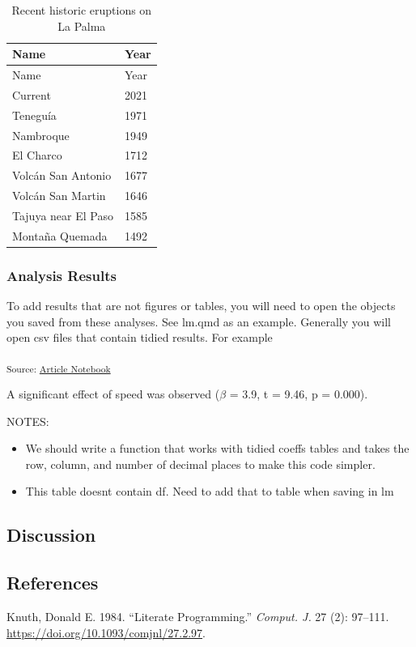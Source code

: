 \documentclass[
  letterpaper,
  DIV=11,
  numbers=noendperiod]{scrartcl}
\providecommand{\tightlist}{%
  \setlength{\itemsep}{0pt}\setlength{\parskip}{0pt}}\usepackage{longtable,booktabs,array}
\newlength{\cslhangindent}
\newenvironment{CSLReferences}[2] %
 {\begin{list}{}{%
  \setlength{\itemindent}{0pt}
  \setlength{\leftmargin}{0pt}
  \setlength{\parsep}{0pt}
  \ifodd #1
   \setlength{\leftmargin}{\cslhangindent}
   \setlength{\itemindent}{-1\cslhangindent}
  \fi
  \setlength{\itemsep}{#2\baselineskip}}}
 {\end{list}}
\begin{document}
\begin{longtable}[]{@{}ll@{}}
\caption{Recent historic eruptions on La
Palma}\label{tbl-history}\tabularnewline
\toprule\noalign{}
Name & Year \\
\midrule\noalign{}
\endfirsthead
\toprule\noalign{}
Name & Year \\
\midrule\noalign{}
\endhead
\bottomrule\noalign{}
\endlastfoot
Current & 2021 \\
Teneguía & 1971 \\
Nambroque & 1949 \\
El Charco & 1712 \\
Volcán San Antonio & 1677 \\
Volcán San Martin & 1646 \\
Tajuya near El Paso & 1585 \\
Montaña Quemada & 1492 \\
\end{longtable}

\subsubsection{Analysis Results}\label{analysis-results}

To add results that are not figures or tables, you will need to open the
objects you saved from these analyses. See lm.qmd as an example.
Generally you will open csv files that contain tidied results. For
example

\textsubscript{Source:
\href{https://jjcurtin.github.io/study_test/index.qmd.html}{Article
Notebook}}

A significant effect of speed was observed (\(\beta\) = 3.9, t = 9.46, p
= 0.000).

NOTES:

\begin{itemize}
\tightlist
\item
  We should write a function that works with tidied coeffs tables and
  takes the row, column, and number of decimal places to make this code
  simpler.
\item
  This table doesnt contain df. Need to add that to table when saving in
  lm
\end{itemize}

\subsection{Discussion}\label{discussion}

\subsection{References}\label{references}

\label{refs}
\begin{CSLReferences}{1}{0}
Knuth, Donald E. 1984. {``Literate Programming.''} \emph{Comput. J.} 27
(2): 97--111. \url{https://doi.org/10.1093/comjnl/27.2.97}.

\end{CSLReferences}
\end{document}
